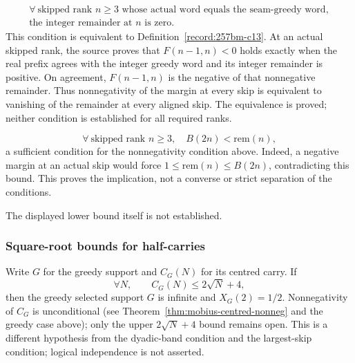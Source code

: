 \begin{thm}\label{record:257bm-c14}
\[
\begin{gathered}
 \forall\ \text{skipped rank }n\ge3\text{ whose actual word equals the seam-greedy word},\\
 \text{the integer remainder at }n\text{ is zero}.
\end{gathered}
\]
This condition is equivalent to Definition~\ref{record:257bm-c13}.
At an actual skipped rank, the source proves that
$F(n-1,n)<0$ holds exactly when the real prefix agrees with the
integer greedy word and its integer remainder is positive.
On agreement, $F(n-1,n)$ is the negative of that nonnegative
remainder.  Thus nonnegativity of the margin at every skip is
equivalent to vanishing of the remainder at every aligned skip.
The equivalence is proved; neither condition is established for all
required ranks.
\end{thm}

\begin{thm}\label{record:257bm-c15}
\[
\forall\ \text{skipped rank }n\ge3,\quad B(2n) < \mathrm{rem}(n),
\]
a sufficient condition for the nonnegativity condition above.
Indeed, a negative margin at an actual skip would force
$1\le\mathrm{rem}(n)\le B(2n)$, contradicting this bound.
This proves the implication, not a converse or strict separation of the conditions.
\end{thm}
The displayed lower bound itself is not established.

\subsubsection*{Square-root bounds for half-carries}

\begin{thm}\label{record:257rig-c16}
Write $G$ for the greedy support and $C_G(N)$ for its centred carry. If
\[
\forall N,\qquad C_G(N) \le 2\sqrt N + 4,
\]
then the greedy selected support $G$ is infinite and $X_G(2)=1/2$.
Nonnegativity of $C_G$ is unconditional (see
Theorem~\ref{thm:mobius-centred-nonneg} and the greedy case above); only the upper
$2\sqrt N+4$ bound remains open. This is a different hypothesis from the dyadic-band
condition and the largest-skip condition; logical independence is not
asserted.
\end{thm}

